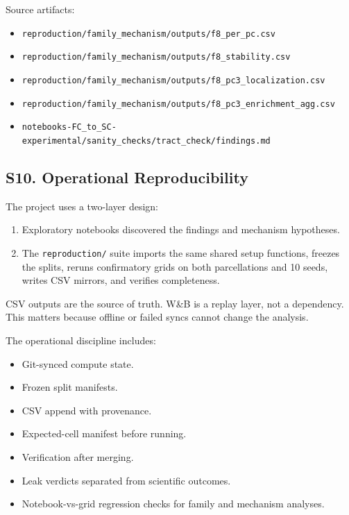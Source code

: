 Source artifacts:

\begin{itemize}
\tightlist
\item
  \texttt{reproduction/family\_mechanism/outputs/f8\_per\_pc.csv}
\item
  \texttt{reproduction/family\_mechanism/outputs/f8\_stability.csv}
\item
  \texttt{reproduction/family\_mechanism/outputs/f8\_pc3\_localization.csv}
\item
  \texttt{reproduction/family\_mechanism/outputs/f8\_pc3\_enrichment\_agg.csv}
\item
  \texttt{notebooks-FC\_to\_SC-experimental/sanity\_checks/tract\_check/findings.md}
\end{itemize}

\subsection{S10. Operational Reproducibility}\label{s10-operational-reproducibility}

The project uses a two-layer design:

\begin{enumerate}
\def\labelenumi{\arabic{enumi}.}
\tightlist
\item
  Exploratory notebooks discovered the findings and mechanism hypotheses.
\item
  The \texttt{reproduction/} suite imports the same shared setup functions, freezes the splits, reruns confirmatory grids on both parcellations and 10 seeds, writes CSV mirrors, and verifies completeness.
\end{enumerate}

CSV outputs are the source of truth. W\&B is a replay layer, not a dependency. This matters because offline or failed syncs cannot change the analysis.

The operational discipline includes:

\begin{itemize}
\tightlist
\item
  Git-synced compute state.
\item
  Frozen split manifests.
\item
  CSV append with provenance.
\item
  Expected-cell manifest before running.
\item
  Verification after merging.
\item
  Leak verdicts separated from scientific outcomes.
\item
  Notebook-vs-grid regression checks for family and mechanism analyses.
\end{itemize}

